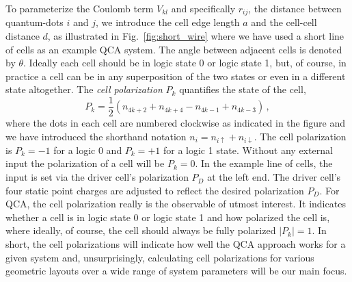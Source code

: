 To parameterize the Coulomb term $V_{kl}$ and specifically $r_{ij}$, the
distance between quantum-dots $i$ and $j$, we introduce the cell edge length $a$
and the cell-cell distance $d$, as illustrated in Fig.~\ref{fig:short_wire}
where we have used a short line of cells as an example QCA system. The angle
between adjacent cells is denoted by $\theta$. Ideally each cell should be in
logic state 0 or logic state 1, but, of course, in practice a cell can be in any
superposition of the two states or even in a different state altogether. The
\emph{cell polarization} $P_k$ quantifies the state of the cell,
\begin{equation}
  \label{eq:polarization}
  P_k = \frac{1}{2} \left( n_{4k+2} + n_{4k+4} - n_{4k-1} + n_{4k-3} \right) \, ,
\end{equation}
where the dots in each cell are numbered clockwise as indicated in the figure
and we have introduced the shorthand notation $n_i = n_{i\uparrow} +
n_{i\downarrow}$. The cell polarization is $P_k = -1$ for a logic 0 and $P_k =
+1$ for a logic 1 state. Without any external input the polarization of a cell
will be $P_k = 0$.  In the example line of cells, the input is set via the
driver cell's polarization $P_D$ at the left end. The driver cell's four static
point charges are adjusted to reflect the desired polarization $P_D$. For QCA,
the cell polarization really is the observable of utmost interest. It indicates
whether a cell is in logic state 0 or logic state 1 and how polarized the cell
is, where ideally, of course, the cell should always be fully polarized $|P_k| =
1$. In short, the cell polarizations will indicate how well the QCA approach
works for a given system and, unsurprisingly, calculating cell polarizations for
various geometric layouts over a wide range of system parameters will be our
main focus.

